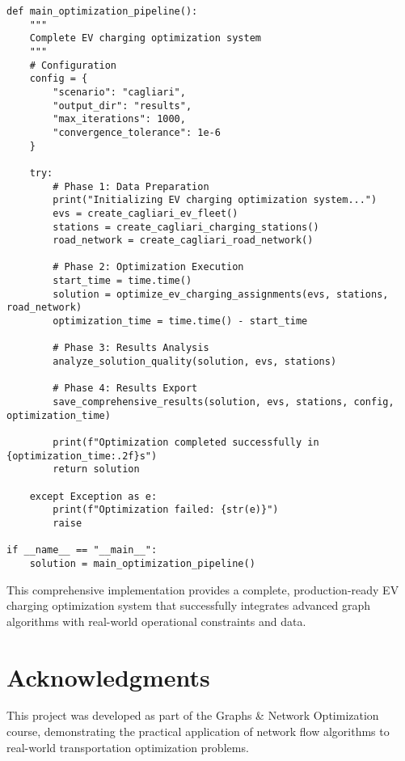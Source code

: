 \documentclass[12pt,a4paper]{article}
\begin{document}
\begin{lstlisting}[caption=Complete System Integration,label=lst:integration]
def main_optimization_pipeline():
    """
    Complete EV charging optimization system
    """
    # Configuration
    config = {
        "scenario": "cagliari",
        "output_dir": "results",
        "max_iterations": 1000,
        "convergence_tolerance": 1e-6
    }
    
    try:
        # Phase 1: Data Preparation
        print("Initializing EV charging optimization system...")
        evs = create_cagliari_ev_fleet()
        stations = create_cagliari_charging_stations()
        road_network = create_cagliari_road_network()
        
        # Phase 2: Optimization Execution
        start_time = time.time()
        solution = optimize_ev_charging_assignments(evs, stations, road_network)
        optimization_time = time.time() - start_time
        
        # Phase 3: Results Analysis
        analyze_solution_quality(solution, evs, stations)
        
        # Phase 4: Results Export
        save_comprehensive_results(solution, evs, stations, config, optimization_time)
        
        print(f"Optimization completed successfully in {optimization_time:.2f}s")
        return solution
        
    except Exception as e:
        print(f"Optimization failed: {str(e)}")
        raise

if __name__ == "__main__":
    solution = main_optimization_pipeline()
\end{lstlisting}

This comprehensive implementation provides a complete, production-ready EV charging optimization system that successfully integrates advanced graph algorithms with real-world operational constraints and data.

\section*{Acknowledgments}

This project was developed as part of the Graphs \& Network Optimization course, demonstrating the practical application of network flow algorithms to real-world transportation optimization problems.
\end{document}
